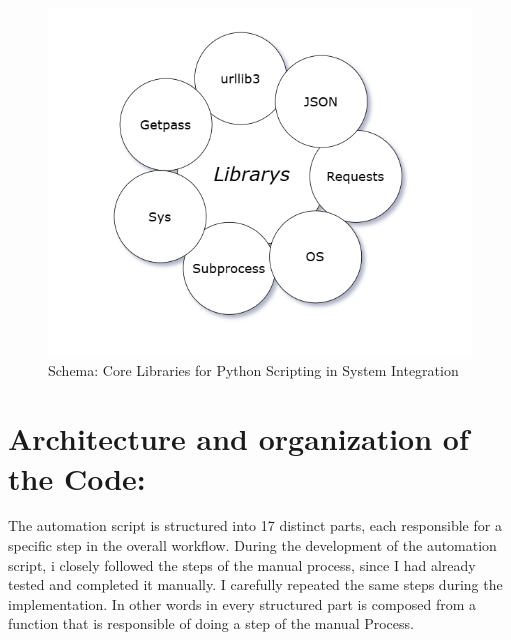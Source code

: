 \begin{figure}
    \centering
    \includegraphics[width=0.7\linewidth]{en/content/lp.png}
    \caption{Schema: Core Libraries for Python Scripting in System Integration }
    \label{fig:enter-label}
\end{figure}


\section{Architecture and organization of the Code:}
 The automation script is structured into 17 distinct parts, each responsible for a specific step in the overall workflow.
 During the development of the automation script, i closely followed the steps of the manual process, since I had already tested and completed it manually. I carefully repeated the same steps during the implementation. In other words in every structured part is composed from a function that is responsible of doing a step of the manual Process.
 
